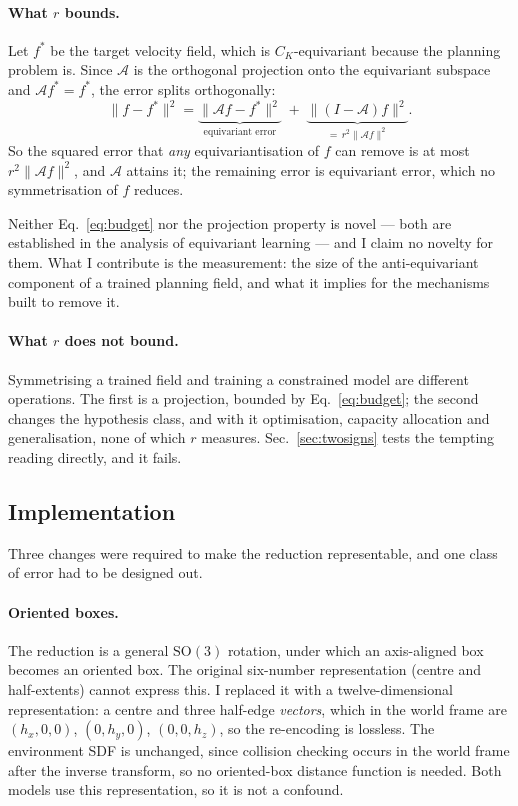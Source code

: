 \documentclass[11pt,a4paper]{article}
\newcommand{\SO}{\mathrm{SO}}
\begin{document}
\paragraph{What $r$ bounds.} Let $f^\ast$ be the target velocity field, which is
$C_K$-equivariant because the planning problem is. Since $\mathcal{A}$ is the
orthogonal projection onto the equivariant subspace and $\mathcal{A}f^\ast =
f^\ast$, the error splits orthogonally:
\begin{equation}
  \|f - f^\ast\|^2 =
  \underbrace{\|\mathcal{A}f - f^\ast\|^2}_{\text{equivariant error}}
  \;+\; \underbrace{\|(I - \mathcal{A})f\|^2}_{=\, r^2 \|\mathcal{A}f\|^2} .
  \label{eq:budget}
\end{equation}
So the squared error that \emph{any} equivariantisation of $f$ can remove is at
most $r^2\|\mathcal{A}f\|^2$, and $\mathcal{A}$ attains it; the remaining error is
equivariant error, which no symmetrisation of $f$ reduces.

Neither Eq.~\eqref{eq:budget} nor the projection property is novel --- both are
established in the analysis of equivariant learning --- and I claim no novelty
for them. What I contribute is the measurement: the size of the anti-equivariant
component of a trained planning field, and what it implies for the mechanisms
built to remove it.

\paragraph{What $r$ does not bound.} Symmetrising a trained field and training a
constrained model are different operations. The first is a projection, bounded by
Eq.~\eqref{eq:budget}; the second changes the hypothesis class, and with it
optimisation, capacity allocation and generalisation, none of which $r$ measures.
Sec.~\ref{sec:twosigns} tests the tempting reading directly, and it fails.

\subsection{Implementation}
\label{sec:impl}

Three changes were required to make the reduction representable, and one class of
error had to be designed out.

\paragraph{Oriented boxes.} The reduction is a general $\SO(3)$ rotation, under
which an axis-aligned box becomes an oriented box. The original six-number
representation (centre and half-extents) cannot express this. I replaced it with
a twelve-dimensional representation: a centre and three half-edge \emph{vectors},
which in the world frame are $(h_x,0,0)$, $(0,h_y,0)$, $(0,0,h_z)$, so the
re-encoding is lossless. The environment SDF is unchanged, since collision
checking occurs in the world frame after the inverse transform, so no
oriented-box distance function is needed. Both models use this representation, so
it is not a confound.
\end{document}
